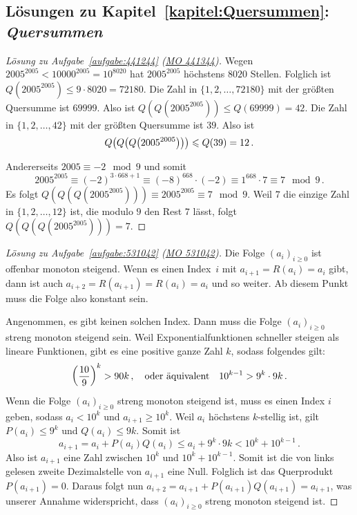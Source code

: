 \subsection*{Lösungen zu Kapitel~\ref{kapitel:Quersummen}: \emph{Quersummen}}

\begin{proof}[Lösung zu Aufgabe~\ref{aufgabe:441244} \textmd{(\href{https://www.mathematik-olympiaden.de/moev/index.php?option=com_download&thema=a&format=raw&datei=A44134b.pdf}{MO 441344})}]
	Wegen $2005^{2005}<10000^{2005}=10^{8020}$ hat $2005^{2005}$ höchstens $8020$ Stellen. Folglich ist $Q(2005^{2005})\leqslant 9\cdot 8020=72180$. Die Zahl in $\{1,2,\dotsc,72180\}$ mit der größten Quersumme ist $69999$. Also ist $Q(Q(2005^{2005}))\leqslant Q(69999)=42$. Die Zahl in $\{1,2,\dotsc,42\}$ mit der größten Quersumme ist $39$. Also ist
	\begin{equation*}
		Q\parens*{Q\parens*{Q\parens*{2005^{2005}}}}\leqslant Q(39)=12\,.
	\end{equation*}
	
	Andererseits $2005\equiv -2\mod 9$ und somit
	\begin{equation*}
		2005^{2005}\equiv (-2)^{3\cdot 668+1}\equiv (-8)^{668}\cdot (-2)\equiv 1^{668}\cdot 7\equiv 7\mod 9\,.
	\end{equation*}
	Es folgt $Q(Q(Q(2005^{2005})))\equiv 2005^{2005}\equiv 7\mod 9$. Weil $7$ die einzige Zahl in $\{1,2,\dotsc,12\}$ ist, die modulo $9$ den Rest $7$ lässt, folgt $Q(Q(Q(2005^{2005})))=7$.
\end{proof}
\begin{proof}[Lösung zu Aufgabe~\ref{aufgabe:531042} \textmd{(\href{https://www.mathematik-olympiaden.de/moev/index.php?option=com_download&thema=a&format=raw&datei=A53104a.pdf}{MO 531042})}]
	Die Folge $(a_i)_{i\geqslant 0}$ ist offenbar monoton steigend. Wenn es einen Index~$i$ mit $a_{i+1}=R(a_i)=a_i$ gibt, dann ist auch $a_{i+2}=R(a_{i+1})=R(a_i)=a_i$ und so weiter. Ab diesem Punkt muss die Folge also konstant sein.
	
	Angenommen, es gibt keinen solchen Index. Dann muss die Folge $(a_i)_{i\geqslant 0}$ streng monoton steigend sein. Weil Exponentialfunktionen schneller steigen als lineare Funktionen, gibt es eine positive ganze Zahl $k$, sodass folgendes gilt:
	\begin{equation*}
		\parens*{\frac{10}{9}}^k>90k\,,\quad \text{oder äquivalent}\quad 10^{k-1}>9^k\cdot 9k\,.
	\end{equation*}
	Wenn die Folge $(a_i)_{i\geqslant 0}$ streng monoton steigend ist, muss es einen Index $i$ geben, sodass $a_i<10^k$ und $a_{i+1}\geqslant 10^k$. Weil $a_i$ höchstens $k$-stellig ist, gilt $P(a_i)\leqslant 9^k$ und $Q(a_i)\leqslant 9k$. Somit ist
	\begin{equation*}
		a_{i+1}=a_i+P(a_i)Q(a_i)\leqslant a_i+9^k\cdot 9k<10^{k}+10^{k-1}\,.
	\end{equation*}
	Also ist $a_{i+1}$ eine Zahl zwischen $10^k$ und $10^k+10^{k-1}$. Somit ist die von links gelesen zweite Dezimalstelle von $a_{i+1}$ eine Null. Folglich ist das Querprodukt $P(a_{i+1})=0$. Daraus folgt nun $a_{i+2}=a_{i+1}+P(a_{i+1})Q(a_{i+1})=a_{i+1}$, was unserer Annahme widerspricht, dass $(a_i)_{i\geqslant 0}$ streng monoton steigend ist.
\end{proof}